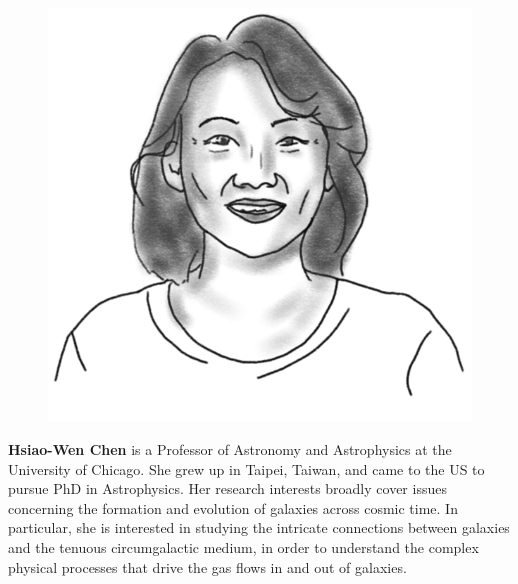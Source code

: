 \begin{figure}
\vspace{13pt}
\includegraphics[width=0.9\linewidth]{portraits/hsiao-wen.png}
\end{figure}
\textbf{Hsiao-Wen Chen} is a Professor of Astronomy and Astrophysics at the University of Chicago.  She grew up in Taipei, Taiwan, and came to the US to pursue PhD in Astrophysics.  Her research interests broadly cover issues concerning the formation and evolution of galaxies across cosmic time. In particular, she is interested in studying the intricate connections between galaxies and the tenuous circumgalactic medium, in order to understand the complex physical processes that drive the gas flows in and out of galaxies.\\
\\

\vspace{-10pt}

